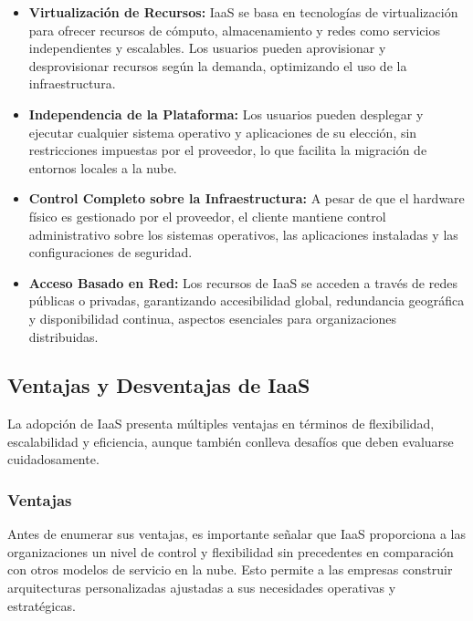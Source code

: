 {            \begin{itemize}
                \item \textbf{Virtualización de Recursos:} IaaS se basa en tecnologías de virtualización para ofrecer recursos de cómputo, almacenamiento y redes como servicios independientes y escalables. Los usuarios pueden aprovisionar y desprovisionar recursos según la demanda, optimizando el uso de la infraestructura.
                \item \textbf{Independencia de la Plataforma:} Los usuarios pueden desplegar y ejecutar cualquier sistema operativo y aplicaciones de su elección, sin restricciones impuestas por el proveedor, lo que facilita la migración de entornos locales a la nube.
                \item \textbf{Control Completo sobre la Infraestructura:} A pesar de que el hardware físico es gestionado por el proveedor, el cliente mantiene control administrativo sobre los sistemas operativos, las aplicaciones instaladas y las configuraciones de seguridad.
                \item \textbf{Acceso Basado en Red:} Los recursos de IaaS se acceden a través de redes públicas o privadas, garantizando accesibilidad global, redundancia geográfica y disponibilidad continua, aspectos esenciales para organizaciones distribuidas.
            \end{itemize}
            
        \subsection{Ventajas y Desventajas de IaaS}
            La adopción de IaaS presenta múltiples ventajas en términos de flexibilidad, escalabilidad y eficiencia, aunque también conlleva desafíos que deben evaluarse cuidadosamente.
            
            \subsubsection{Ventajas}
                Antes de enumerar sus ventajas, es importante señalar que IaaS proporciona a las organizaciones un nivel de control y flexibilidad sin precedentes en comparación con otros modelos de servicio en la nube. Esto permite a las empresas construir arquitecturas personalizadas ajustadas a sus necesidades operativas y estratégicas.
                
}
